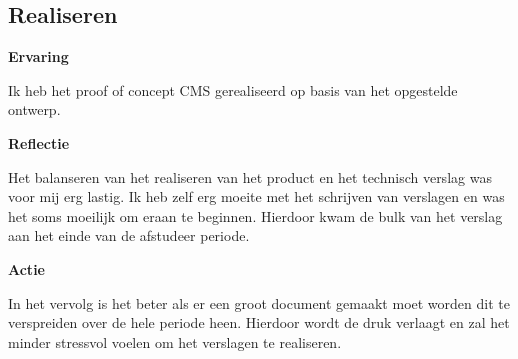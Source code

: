 \subsection{Realiseren}
\textbf{Ervaring}

\whitespace
Ik heb het proof of concept \gls{CMS} gerealiseerd op basis van het opgestelde ontwerp.

\whitespace
\textbf{Reflectie}

\whitespace
Het balanseren van het realiseren van het product en het technisch verslag was voor mij erg lastig.
Ik heb zelf erg moeite met het schrijven van verslagen en was het soms moeilijk om eraan te beginnen.
Hierdoor kwam de bulk van het verslag aan het einde van de afstudeer periode.

\whitespace
\textbf{Actie}

\whitespace
In het vervolg is het beter als er een groot document gemaakt moet worden dit te verspreiden over de hele periode heen.
Hierdoor wordt de druk verlaagt en zal het minder stressvol voelen om het verslagen te realiseren.
